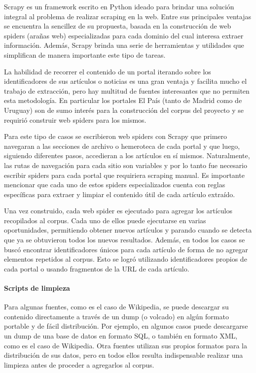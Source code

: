 Scrapy es un framework escrito en Python ideado para brindar una solución integral al problema de
realizar scraping en la web. Entre sus principales ventajas se encuentra la sencillez de su
propuesta, basada en la construcción de web spiders (arañas web) especializadas para cada dominio
del cual interesa extraer información. Además, Scrapy brinda una serie de herramientas y utilidades
que simplifican de manera importante este tipo de tareas.

La habilidad de recorrer el contenido de un portal iterando sobre los identificadores de sus artículos
o noticias es una gran ventaja y facilita mucho el trabajo de extracción, pero hay multitud de fuentes
interesantes que no permiten esta metodología. En particular los portales El País (tanto de Madrid
como de Uruguay) son de sumo interés para la construcción del corpus del proyecto y se requirió
construir web spiders para los mismos.

Para este tipo de casos se escribieron web spiders con Scrapy que primero navegaran a las
secciones de archivo o hemeroteca de cada portal y que luego, siguiendo diferentes pasos,
accedieran a los artículos en sí mismos. Naturalmente, las rutas de navegación para cada sitio
son variables y por lo tanto fue necesario escribir spiders para cada portal que requiriera
scraping manual. Es importante mencionar que cada uno de estos spiders especializados cuenta
con reglas específicas para extraer y limpiar el contenido útil de cada artículo extraído.

Una vez construido, cada web spider es ejecutado para agregar los artículos recopilados al corpus.
Cada uno de ellos puede ejecutarse en varias oportunidades, permitiendo obtener nuevos artículos y
parando cuando se detecta que ya se obtuvieron todos los nuevos resultados. Además, en todos
los casos se buscó encontrar identificadores únicos para cada artículo de forma de no agregar
elementos repetidos al corpus. Esto se logró utilizando identificadores propios de cada portal o usando
fragmentos de la URL de cada artículo.

\paragraph{Scripts de limpieza}

Para algunas fuentes, como es el caso de Wikipedia, se puede descargar su contenido directamente
a través de un dump (o volcado) en algún formato portable y de fácil distribución. Por ejemplo, en
algunos casos puede descargarse un dump de una base de datos en formato SQL, o también en
formato XML, como es el caso de Wikipedia. Otra fuentes utilizan sus propios formatos para la
distribución de sus datos, pero en todos ellos resulta indispensable realizar una limpieza antes
de proceder a agregarlos al corpus.

